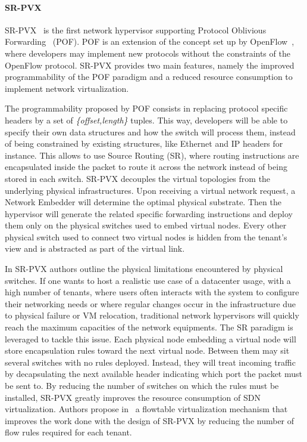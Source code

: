 \paragraph{SR-PVX}
SR-PVX~\cite{PVX-Li2017} is the first network hypervisor supporting Protocol Oblivious Forwarding~\cite{pof-song2013} (POF). POF is an extension of the concept set up by OpenFlow~\cite{Openflow-McKeown2008}, where developers may implement new protocols without the constraints of the OpenFlow protocol.
SR-PVX provides two main features, namely the improved programmability of the POF paradigm and a reduced resource consumption to implement network virtualization.

The programmability proposed by POF consists in replacing protocol specific headers by a set of \textit{\{offset,length\}} tuples. This way, developers will be able to specify their own data structures and how the switch will process them, instead of being constrained by existing structures, like Ethernet and IP headers for instance. This allows to use Source Routing (SR), where routing instructions are encapsulated inside the packet to route it across the network instead of being stored in each switch.
SR-PVX decouples the virtual topologies from the underlying physical infrastructures.
Upon receiving a virtual network request, a Network Embedder will determine the optimal physical substrate. Then the hypervisor will generate the related specific forwarding instructions and deploy them only on the physical switches used to embed virtual nodes. Every other physical switch used to connect two virtual nodes is hidden from the tenant's view and is abstracted as part of the virtual link.

In SR-PVX authors outline the physical limitations encountered by physical switches. If one wants to host a realistic use case of a datacenter usage, with a high number of tenants, where users often interacts with the system to configure their networking needs or where regular changes occur in the infrastructure due to physical failure or VM relocation, traditional network hypervisors will quickly reach the maximum capacities of the network equipments. The SR paradigm is leveraged to tackle this issue. Each physical node embedding a virtual node will store encapsulation rules toward the next virtual node. Between them may sit several switches with no rules deployed. Instead, they will treat incoming traffic by decapsulating the next available header indicating which port the packet must be sent to. By reducing the number of switches on which the rules must be installed, SR-PVX greatly improves the resource consumption of SDN virtualization. Authors propose in~\cite{pvflow-Li2018} a flowtable virtualization mechanism that improves the work done with the design of SR-PVX by reducing the number of flow rules required for each tenant.


